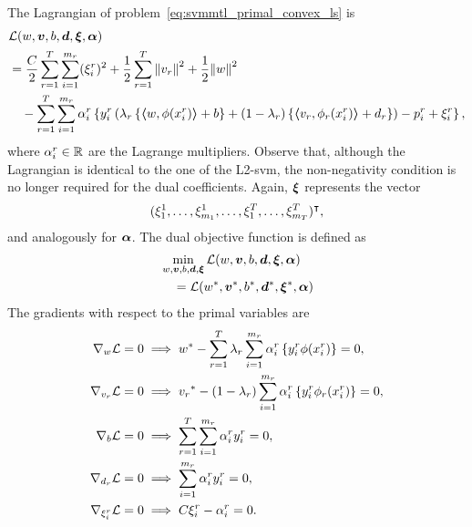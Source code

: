The Lagrangian of problem~\eqref{eq:svmmtl_primal_convex_ls} is
\begin{equation}\label{eq:svmmtl_lagrangian_convex_ls}
    \begin{aligned}
        & \lagr({w}, \fv{v}, b, \fv{d}, \fv{\xi}, \fv{\alpha}) \\
        &=  \frac{C}{2} \sum_{r= 1}^T \sum_{i=1}^{m_r} ({\xi_{i}^r})^2 + \frac{1}{2} \sum_{r= 1}^T{\norm{{v}_r}^2} + \frac{1}{2} {\norm{{w}}}^2 \\
        &\quad -  \sum_{r= 1}^T \sum_{i=1}^{m_r} \alpha_i^r \left\lbrace y_{i}^r  \left(\lambda_r \left\lbrace \dotp{w}{\phi(x_{i}^r)} + b  \right\rbrace + (1 - \lambda_r) \left\lbrace \dotp{{v}_r}{\phi_r(x_{i}^r)} + d_r \right\rbrace  \right) - p_{i}^r + \xi_{i}^r  \right\rbrace ,
    \end{aligned}
\end{equation}
where $\alpha_i^r \in \mathbb{R}$ are the Lagrange multipliers. Observe that, although the Lagrangian is identical to the one of the L2-\acrshort{svm}, the non-negativity condition is no longer required for the dual coefficients.  Again, $\bm{\xi}$ represents the vector $$(\xi_1^1, \ldots, \xi_{m_1}^1, \ldots, \xi_1^T, \ldots, \xi_{m_T}^T)^\intercal,$$ and analogously for $\bm{\alpha}$. The dual objective function is defined as 
\begin{equation}\nonumber
    \begin{aligned}
          &  \min_{{w}, \bm{v}, b, \bm{d}, \bm{\xi}} \mathcal{L}({w}, \bm{v}, b, \bm{d}, \bm{\xi}, \bm{\alpha}) \\
         &\quad = \mathcal{L}({{w}}^*, {\bm{v}}^*, {b}^*, {\bm{d}}^*, {\bm{\xi}}^*, \bm{\alpha})
    \end{aligned}    
\end{equation}
The gradients with respect to the primal variables are
\begin{align}
    \grad_{{w}} \lagr = 0  &\implies \optim{{w}} - \sum_{r= 1}^\ntasks \lambda_r \sum_{i=1}^{m_r} {\alpha_i^r} \left\lbrace y_i^r \phi(x_i^r) \right\rbrace = 0 , \label{eq:common_repr_conv_ls} \\
    \grad_{{v}_r} \lagr = 0 &\implies \optim{{v}_r} - (1 - \lambda_r) \sum_{i=1}^{m_r} {\alpha_i^r} \left\lbrace y_i^r \phi_r(x_i^r) \right\rbrace = 0 , \label{eq:specific_repr_conv_ls} \\
    \grad_{b} \lagr = 0  &\implies \sum_{r= 1}^T \sum_{i=1}^{m_r} {\alpha_i^r} y_i^r = 0 , \label{eq:specific_eqconstr_conv_ls}  \\
    \grad_{{d}_r} \lagr = 0 &\implies \sum_{i=1}^{m_r} {\alpha_i^r} y_i^r = 0 , \label{eq:common_eqconstr_conv_ls} \\
    \grad_{\xi_i^r} \lagr = 0 &\implies C \xi_i^r - {\alpha_i^r} = 0 . \label{eq:xi_feas_conv_ls}
\end{align}
